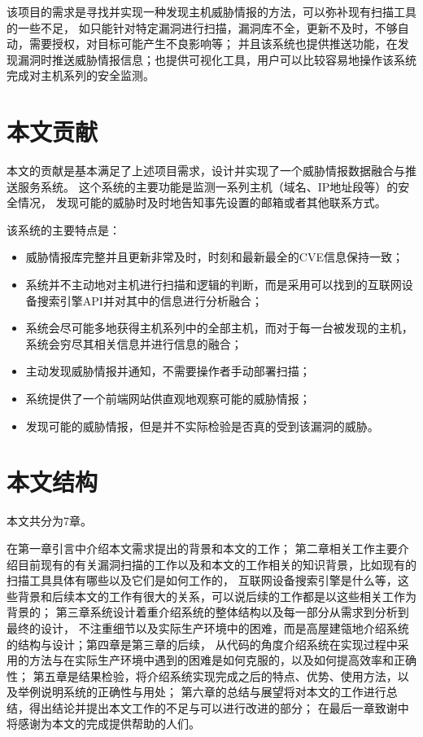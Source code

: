 该项目的需求是寻找并实现一种发现主机威胁情报的方法，可以弥补现有扫描工具的一些不足，
如只能针对特定漏洞进行扫描，漏洞库不全，更新不及时，不够自动，需要授权，对目标可能产生不良影响等；
并且该系统也提供推送功能，在发现漏洞时推送威胁情报信息；也提供可视化工具，用户可以比较容易地操作该系统完成对主机系列的安全监测。

\section{本文贡献}
\label{sec:contributions} 

本文的贡献是基本满足了上述项目需求，设计并实现了一个威胁情报数据融合与推送服务系统。
这个系统的主要功能是监测一系列主机（域名、IP地址段等）的安全情况，
发现可能的威胁时及时地告知事先设置的邮箱或者其他联系方式。

该系统的主要特点是：
\begin{itemize}
  \item 威胁情报库完整并且更新非常及时，时刻和最新最全的CVE信息保持一致；
  \item 系统并不主动地对主机进行扫描和逻辑的判断，而是采用可以找到的互联网设备搜索引擎API并对其中的信息进行分析融合；
  \item 系统会尽可能多地获得主机系列中的全部主机，而对于每一台被发现的主机，系统会穷尽其相关信息并进行信息的融合；
  \item 主动发现威胁情报并通知，不需要操作者手动部署扫描；
  \item 系统提供了一个前端网站供直观地观察可能的威胁情报；
  \item 发现可能的威胁情报，但是并不实际检验是否真的受到该漏洞的威胁。
\end{itemize}

\section{本文结构}
\label{sec:structure}

本文共分为7章。

在第一章引言中介绍本文需求提出的背景和本文的工作；
第二章相关工作主要介绍目前现有的有关漏洞扫描的工作以及和本文的工作相关的知识背景，比如现有的扫描工具具体有哪些以及它们是如何工作的，
互联网设备搜索引擎是什么等，这些背景和后续本文的工作有很大的关系，可以说后续的工作都是以这些相关工作为背景的；
第三章系统设计着重介绍系统的整体结构以及每一部分从需求到分析到最终的设计，
不注重细节以及实际生产环境中的困难，而是高屋建瓴地介绍系统的结构与设计；第四章是第三章的后续，
从代码的角度介绍系统在实现过程中采用的方法与在实际生产环境中遇到的困难是如何克服的，以及如何提高效率和正确性；
第五章是结果检验，将介绍系统实现完成之后的特点、优势、使用方法，以及举例说明系统的正确性与用处；
第六章的总结与展望将对本文的工作进行总结，得出结论并提出本文工作的不足与可以进行改进的部分；
在最后一章致谢中将感谢为本文的完成提供帮助的人们。
